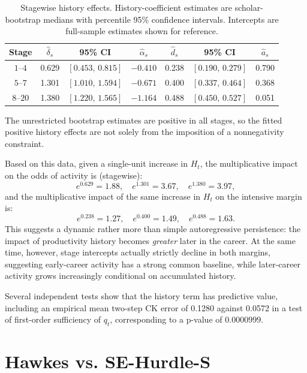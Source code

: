 \documentclass[twocolumn, letterpaper]{article}
\begin{document}
\begin{table}[!h]
\centering
\caption{Stagewise history effects. History-coefficient estimates are
scholar-bootstrap medians with percentile 95\% confidence intervals.
Intercepts are full-sample estimates shown for reference.}
\label{tab:history_effects}

\begin{tabular}{||c| c| c| c| c| c| c||}
\hline
Stage
& $\hat{\delta}_s$ & 95\% CI & $\hat{\alpha}_s$ & $\hat{d}_s$ & 95\% CI & $\hat{a}_s$ \\
\hline
$1$--$4$
& 0.629 & $[0.453,\,0.815]$ & $-0.410$ & 0.238 & $[0.190,\,0.279]$ & 0.790 \\
\hline
$5$--$7$
& 1.301 & $[1.010,\,1.594]$ & $-0.671$ & 0.400 & $[0.337,\,0.464]$ & 0.368 \\
\hline
$8$--$20$
& 1.380 & $[1.220,\,1.565]$ & $-1.164$ & 0.488 & $[0.450,\,0.527]$ & 0.051 \\
\hline
\end{tabular}
\end{table}

The unrestricted bootstrap estimates are positive in all stages, so the fitted positive history effects are not solely from the imposition of a nonnegativity constraint.

Based on this data, given a single-unit increase in $H_t$, the multiplicative impact on the odds of activity is (stagewise):
\[
e^{0.629} = 1.88, \quad e^{1.301} = 3.67,\quad e^{1.380}=3.97,
\]
and the multiplicative impact of the same increase in $H_t$ on the intensive margin is:
\[
e^{0.238} = 1.27, \quad e^{0.400} = 1.49, \quad e^{0.488} = 1.63.
\]
This suggests a dynamic rather more than simple autoregressive persistence: the impact of productivity history becomes \emph{greater} later in the career. At the same time, however, stage intercepts actually strictly decline in both margins, suggesting early-career activity has a strong common baseline, while later-career activity grows increasingly conditional on accumulated history.

Several independent tests show that the history term has predictive value, including an empirical mean two-step CK error of 0.1280 against 0.0572 in a test of first-order sufficiency of $q_t$, corresponding to a p-value of $0.0000999$.

\section{Hawkes vs. SE-Hurdle-S}
\label{supp:hawkes_v_se_h_s}
\end{document}
